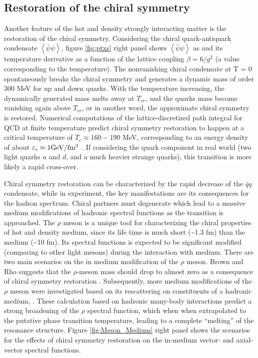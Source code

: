 \subsection{Restoration of the chiral symmetry}

Another feature of the hot and density strongly interacting matter
is the restoration of the chiral symmetry. Considering the chiral
quark-antiquark condensate $\left\langle \bar{\psi}\psi\right\rangle $,
figure \ref{fig:ptxs} right panel shows $\left\langle \bar{\psi}\psi\right\rangle $
as and its temperature derivative as a function of the lattice coupling
$\beta=6/g^{2}$ (a value corresponding to the temperature). The nonvanishing
chiral condensate at T = 0 spontaneously breaks the chiral symmetry
and generates a dynamic mass of order 300 MeV for up and down quarks.
With the temperature increasing, the dynamically generated mass melts
away at $T_{cr}$, and the quarks mass become vanishing again above
$T_{cr}$, or in another word, the approximate chiral symmetry is
restored. Numerical computations of the lattice-discretized path integral
for QCD at finite temperature predict chiral symmetry restoration
to happen at a critical temperature of $T_{c}\approx160-190$ MeV,
corresponding to an energy density of about $\varepsilon_{c}\approx1{\rm GeV/fm^{3}}$
\cite{PhysRevD.74.054507,Aoki200646}. If considering the quark component
in real world (two light quarks $u$ and $d$, and a much heavier
strange quarks), this transition is more likely a rapid cross-over.

Chiral symmetry restoration can be characterized by the rapid decrease
of the $\bar{q}q$ condensate, while in experiment, the key manifestations
are its consequences for the hadron spectrum. Chiral partners must
degenerate which lead to a massive medium modifications of hadronic
spectral functions as the transition is approached. The $\rho$ meson
is a unique tool for characterizing the chiral properties of hot and
density medium, since its life time is much short (\textasciitilde{}1.3
fm) than the medium (\textasciitilde{}10 fm). Its spectral functions
is expected to be significant modified (comparing to other light mesons)
during the interaction with medium. There are two main scenarios on
the in medium modification of the $\rho$ meson. Brown and Rho suggests
that the $\rho$-meson mass should drop to almost zero as a consequence
of chiral symmetry restoration \cite{PhysRevLett.66.2720,Brown1996333}.
Subsequently, more medium modifications of the $\rho$ meson were
investigated based on its rescattering on constituents of a hadronic
medium, \cite{R.-Rapp:2000uq,Cassing199965,Gale:2003qv,Alam2000159}.
These calculation based on hadronic many-body interactions predict
a strong broadening of the $\rho$ spectral function, which when when
extrapolated to the putative phase transition temperature, leading
to a complete “melting” of the resonance structure. Figure \ref{fig:Meson_Medium}
right panel shows the scenarios for the effects of chiral symmetry
restoration on the in-medium vector- and axial-vector spectral functions. 

